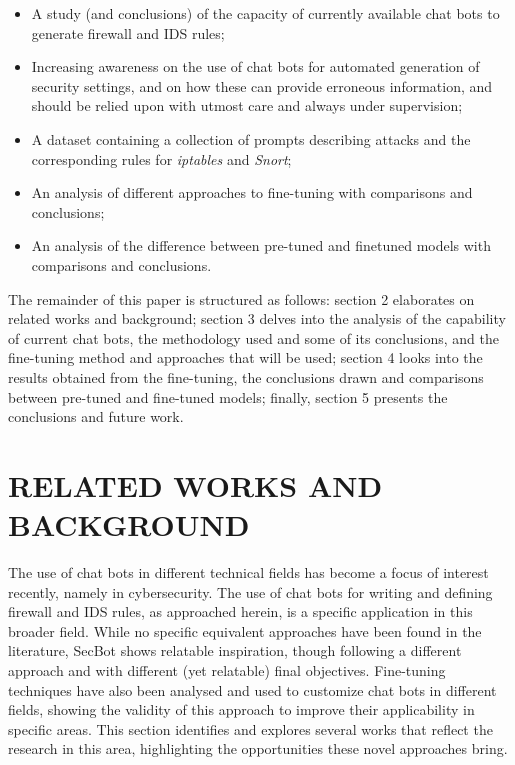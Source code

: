 \documentclass[sigconf]{acmart}
\begin{document}
\begin{itemize}
\item A study (and conclusions) of the capacity of currently available chat bots to generate firewall and IDS rules;
\item Increasing awareness on the use of chat bots for automated
generation of security settings, and on how these can provide erroneous information, and should be relied upon with
utmost care and always under supervision;
\item A dataset containing a collection of prompts describing attacks and the corresponding rules for {\itshape iptables} and {\itshape Snort};
\item An analysis of different approaches to fine-tuning with comparisons and conclusions;
\item An analysis of the difference between pre-tuned and finetuned models with comparisons and conclusions.
\end{itemize}
The remainder of this paper is structured as follows: section 2
elaborates on related works and background; section 3 delves into
the analysis of the capability of current chat bots, the methodology used and some of its conclusions, and the fine-tuning method
and approaches that will be used; section 4 looks into the results
obtained from the fine-tuning, the conclusions drawn and comparisons between pre-tuned and fine-tuned models; finally, section 5
presents the conclusions and future work.


\section{RELATED WORKS AND BACKGROUND}
The use of chat bots in different technical fields has become a focus
of interest recently, namely in cybersecurity. The use of chat bots for
writing and defining firewall and IDS rules, as approached herein, is
a specific application in this broader field. While no specific equivalent approaches have been found in the literature, SecBot \cite{Franco20, Shaqiri21}
shows relatable inspiration, though following a different approach
and with different (yet relatable) final objectives. Fine-tuning techniques have also been analysed and used to customize chat bots
in different fields, showing the validity of this approach to improve their applicability in specific areas. This section identifies
and explores several works that reflect the research in this area,
highlighting the opportunities these novel approaches bring.
\end{document}

